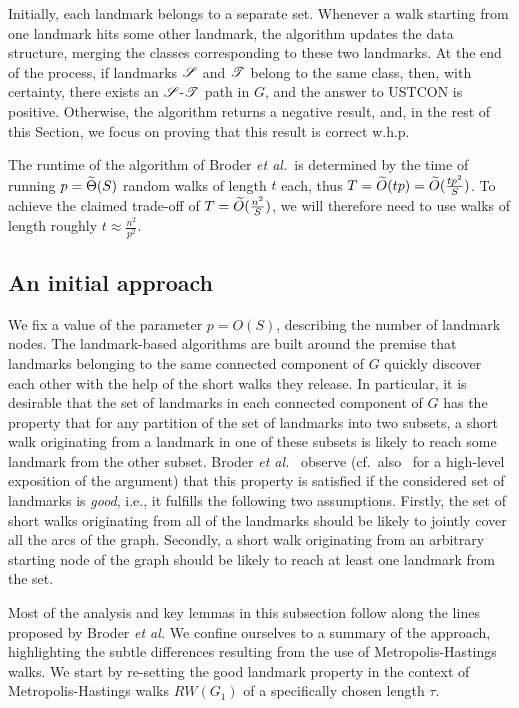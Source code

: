 \documentclass[11pt,a4paper]{article}
\newcommand{\Broder}{Broder \etal}
\newcommand{\etal}{\textsl{et al.}\xspace}
\renewcommand{\O}{\ensuremath \widetilde O}
\newcommand{\Tt}{\ensuremath \widetilde \Theta}
\newcommand{\s}{\ensuremath  \mathscr S}
\renewcommand{\t}{\ensuremath \mathscr  T}
\renewcommand{\*}{\hspace*{5mm}}
\begin{document}
Initially, each landmark belongs to a separate set. Whenever a walk starting from one landmark hits some other landmark, the algorithm updates the data structure, merging the classes corresponding to these two landmarks. At the end of the process, if landmarks $\s$ and $\t$ belong to the same class, then, with certainty, there exists an $\s$-$\t$ path in $G$, and the answer to USTCON is positive. Otherwise, the algorithm returns a negative result, and, in the rest of this Section, we focus on proving that this result is correct w.h.p.

The runtime of the algorithm of \Broder~is determined by the time of running $p = \Tt(S)$ random walks of length $t$ each, thus $T = \O(tp) = \O(\frac{t p^2}{S})$. To achieve the claimed trade-off of $T = \O(\frac{n^2}{S})$, we will therefore need to use walks of length roughly $t \approx \frac{n^2}{p^2}$.

\subsection{An initial approach}\label{sec31}

We fix a value of the parameter $p = O(S)$, describing the number of landmark nodes. The landmark-based algorithms are built around the premise that landmarks belonging to the same connected component of $G$ quickly discover each other with the help of the short walks they release. In particular, it is desirable that the set of landmarks in each connected component of $G$ has the property that for any partition of the set of landmarks into two subsets, a short walk originating from a landmark in one of these subsets is likely to reach some landmark from the other subset. \Broder~\cite{BKRU} observe (cf.\ also~\cite{F} for a high-level exposition of the argument) that this property is satisfied if the considered set of landmarks is \emph{good}, i.e., it fulfills the following two assumptions. Firstly, the set of short walks originating from all of the landmarks should be likely to jointly cover all the arcs of the graph. Secondly, a short walk originating from an arbitrary starting node of the graph should be likely to reach at least one landmark from the set.

Most of the analysis and key lemmas in this subsection follow along the lines proposed by \Broder We confine ourselves to a summary of the approach, highlighting the subtle differences resulting from the use of Metropolis-Hastings walks. We start by re-setting the good landmark property in the context of Metropolis-Hastings walks $RW(G_1)$ of a specifically chosen length $\tau$.
\end{document}
